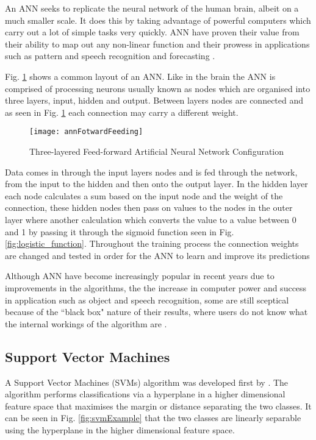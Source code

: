 An ANN seeks to replicate the neural network of the human brain, albeit on a much smaller scale. It does this by taking advantage of powerful computers which carry out a lot of simple tasks very quickly. ANN have proven their value from their ability to map out any non-linear function \citep{white_learning_1989} and their prowess in applications such as pattern and speech recognition and forecasting \citep{kaastra_forecasting_1995}.

Fig. \ref{fig:annFotwardFeeding} shows a common layout of an ANN. Like in the brain the ANN is comprised of processing neurons usually known as nodes which are organised into three layers, input, hidden and output. Between layers nodes are connected and as seen in Fig. \ref{fig:annFotwardFeeding} each connection may carry a different weight.

\begin{figure}[H]
	\texttt{[image: annFotwardFeeding]}
	\caption{Three-layered Feed-forward Artificial Neural Network Configuration \\
				\cite[Source:][]{raju_development_2011}
			}
	\label{fig:annFotwardFeeding}
\end{figure}

Data comes in through the input layers nodes and is fed through the network, from the input to the hidden and then onto the output layer. In the hidden layer each node calculates a sum based on the input node and the weight of the connection, these hidden nodes then pass on values to the nodes in the outer layer where another calculation which converts the value to a value between 0 and 1 by passing it through the sigmoid function seen in Fig. \ref{fig:logistic_function}. Throughout the training process the connection weights are changed and tested in order for the ANN to learn and improve its predictions \citep{haykin_neural_1998}

Although ANN have become increasingly popular in recent years due to improvements in the algorithms, the the increase in computer power and success in application such as object and speech recognition,  some are still sceptical because of the ``black box" nature of their results, where users do not know what the internal workings of the algorithm are  \citep{kaastra_forecasting_1995}. 



\subsection{Support Vector Machines} \label{SVM}
A Support Vector Machines (SVMs) algorithm was developed first by \cite{vapnik_nature_1995}. The algorithm performs classifications via a hyperplane in a higher dimensional feature space that maximises the margin or distance separating the two classes. It can be seen in Fig. \ref{fig:svmExample} that the two classes are linearly separable using the hyperplane in the higher dimensional feature space. 

